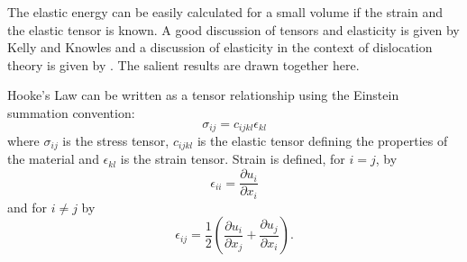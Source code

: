 The elastic energy can be easily calculated for a small volume if the strain and the elastic tensor is known. A good discussion of tensors and elasticity is given by Kelly and Knowles \cite{kelly_knowles2012chapter5_tensors,kelly_knowles2012chapter6_stress_strain} and a discussion of elasticity in the context of dislocation theory is given by \citet{hirth_lothe1982elasticity}. The salient results are drawn together here.

Hooke's Law can be written as a tensor relationship using the Einstein summation convention:
\begin{equation}
\sigma_{ij} = c_{ijkl} \epsilon_{kl}
\end{equation}
where $\sigma_{ij}$ is the stress tensor, $c_{ijkl}$ is the elastic tensor defining the properties of the material and $\epsilon_{kl}$ is the strain tensor. Strain is defined, for $i=j$, by
\begin{equation}
\epsilon_{ii} = \frac{\partial u_i}{\partial x_i}
\end{equation}
and for $i\neq j$ by
\begin{equation}
\epsilon_{ij} = \frac{1}{2} \left( \frac{\partial u_i}{\partial x_j} + \frac{\partial u_j}{\partial x_i} \right).
\end{equation}
